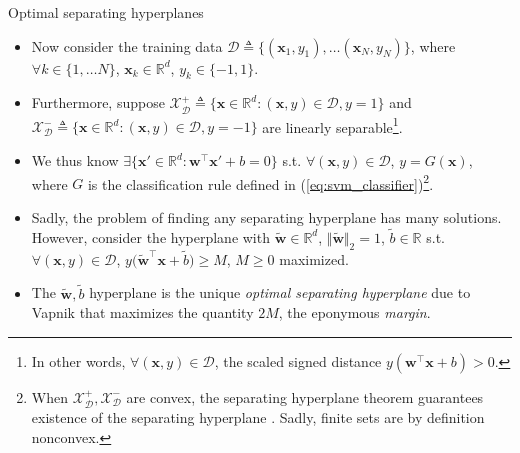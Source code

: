 \documentclass{beamer}
\numberwithin{equation}{section}
\newcommand{\aref}[1]{\alert{\ref{#1}}}
\begin{document}
\begin{frame}{Optimal separating hyperplanes}
    \begin{itemize}
        \item
        Now consider the training data $ \mathcal{D} \triangleq
        \{(\mathbf{x}_1, y_1), \ldots (\mathbf{x}_N, y_N)\} $, where $ \forall
        k \in \{1, \ldots N\} $, $ \mathbf{x}_k \in \mathbb{R}^d $,
        $ y_k \in \{-1, 1\} $.

        \item        
        Furthermore, suppose $ \mathcal{X}_\mathcal{D}^+ \triangleq
        \{\mathbf{x} \in \mathbb{R}^d : (\mathbf{x}, y) \in \mathcal{D},
        y = 1\} $ and $ \mathcal{X}_\mathcal{D}^- \triangleq
        \{\mathbf{x} \in \mathbb{R}^d : (\mathbf{x}, y) \in \mathcal{D},
        y = -1\} $ are linearly separable\footnote{
            In other words, $ \forall (\mathbf{x}, y) \in \mathcal{D} $,
            the scaled signed distance
            $ y(\mathbf{w}^\top\mathbf{x} + b) > 0 $.
        }.

        \item
        We thus know $ \exists \{\mathbf{x}' \in \mathbb{R}^d :
        \mathbf{w}^\top\mathbf{x}' + b = 0\} $ s.t. $ \forall (\mathbf{x}, y)
        \in \mathcal{D} $, $ y = G(\mathbf{x}) $, where $ G $ is the
        classification rule defined in (\aref{eq:svm_classifier})\footnote{
            When $ \mathcal{X}_\mathcal{D}^+, \mathcal{X}_\mathcal{D}^- $ are
            convex, the separating hyperplane theorem guarantees existence
            of the separating hyperplane \cite{bv_convex_opt}. Sadly,
            finite sets are by definition nonconvex.
        }.

        \item
        Sadly, the problem of finding \alert{any} separating hyperplane has
        many solutions. However, consider the hyperplane with
        $ \tilde{\mathbf{w}} \in \mathbb{R}^d $,
        $ \Vert\tilde{\mathbf{w}}\Vert_2 = 1 $, $ \tilde{b} \in \mathbb{R} $
        s.t. $ \forall (\mathbf{x}, y) \in \mathcal{D} $,
        $ y\big(\tilde{\mathbf{w}}^\top\mathbf{x} + \tilde{b}\big) \ge M $,
        $ M \ge 0 $ maximized.

        \item
        The $ \tilde{\mathbf{w}}, \tilde{b} $ hyperplane is the \alert{unique}
        \textit{optimal separating hyperplane} due to Vapnik that maximizes
        the quantity $ 2M $, the eponymous \textit{margin}.
    \end{itemize}

    \medskip
\end{frame}
\end{document}
